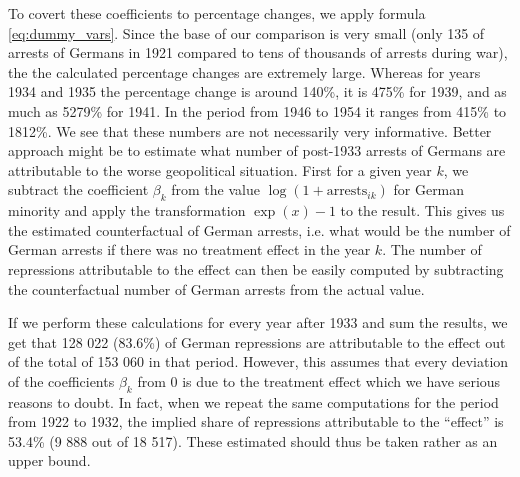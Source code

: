 To covert these coefficients to percentage changes, we apply formula \ref{eq:dummy_vars}. Since the base of our comparison is very small (only 135 of arrests of Germans in 1921 compared to tens of thousands of arrests during war), the the calculated percentage changes are extremely large. 
Whereas for years 1934 and 1935 the percentage change is around 140\%, it is 475\% for 1939, and as much as 5279\% for 1941. In the period from 1946 to 1954 it ranges from 415\% to 1812\%. We see that  these numbers are not necessarily very informative.
Better approach might be to estimate what number of post-1933 arrests of Germans are attributable to the 
worse geopolitical situation. 
First for a given year $k$, we subtract the coefficient $\beta_k$ from the value  $\log\left(1 + \text{arrests}_{ik}\right)$ for German minority and apply the transformation $\exp\left(x\right) - 1$ to the result. %
This gives us the estimated counterfactual of German arrests, i.e. what would be the number of German arrests if there was no treatment effect in the year $k$. The number of repressions attributable to the effect can then be easily computed by subtracting the counterfactual number  of German arrests  from the actual value.

If we perform these calculations for every year after 1933 and sum the results, we get that  128 022 (83.6\%) of German repressions are attributable to the effect out of the total of 153 060 in that period. 
However, this assumes that every deviation of the coefficients $\beta_k$ from 0 is due to the treatment effect which we have serious reasons to doubt. 
In fact, when we repeat the same computations  for the period from 1922 to 1932, the implied share of repressions attributable to the \enquote{effect} is 53.4\% (9 888 out of 18 517). These estimated should thus be taken rather as an upper bound. %


%

